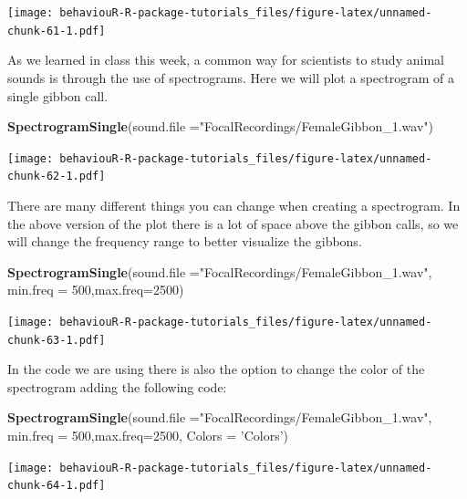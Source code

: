 \documentclass[]{book}
\newenvironment{Shaded}{\begin{snugshade}}{\end{snugshade}}
\newcommand{\DataTypeTok}[1]{\textcolor[rgb]{0.13,0.29,0.53}{#1}}
\newcommand{\DecValTok}[1]{\textcolor[rgb]{0.00,0.00,0.81}{#1}}
\newcommand{\KeywordTok}[1]{\textcolor[rgb]{0.13,0.29,0.53}{\textbf{#1}}}
\newcommand{\NormalTok}[1]{#1}
\newcommand{\StringTok}[1]{\textcolor[rgb]{0.31,0.60,0.02}{#1}}
\begin{document}
\texttt{[image: behaviouR-R-package-tutorials\_files/figure-latex/unnamed-chunk-61-1.pdf]}

As we learned in class this week, a common way for scientists to study animal sounds is through the use of spectrograms. Here we will plot a spectrogram of a single gibbon call.

\begin{Shaded}
\begin{Highlighting}[]
\KeywordTok{SpectrogramSingle}\NormalTok{(}\DataTypeTok{sound.file =}\StringTok{"FocalRecordings/FemaleGibbon_1.wav"}\NormalTok{)}
\end{Highlighting}
\end{Shaded}

\texttt{[image: behaviouR-R-package-tutorials\_files/figure-latex/unnamed-chunk-62-1.pdf]}

There are many different things you can change when creating a spectrogram. In the above version of the plot there is a lot of space above the gibbon calls, so we will change the frequency range to better visualize the gibbons.

\begin{Shaded}
\begin{Highlighting}[]
\KeywordTok{SpectrogramSingle}\NormalTok{(}\DataTypeTok{sound.file =}\StringTok{"FocalRecordings/FemaleGibbon_1.wav"}\NormalTok{,}
                  \DataTypeTok{min.freq =} \DecValTok{500}\NormalTok{,}\DataTypeTok{max.freq=}\DecValTok{2500}\NormalTok{)}
\end{Highlighting}
\end{Shaded}

\texttt{[image: behaviouR-R-package-tutorials\_files/figure-latex/unnamed-chunk-63-1.pdf]}

In the code we are using there is also the option to change the color of the spectrogram adding the following code:

\begin{Shaded}
\begin{Highlighting}[]
\KeywordTok{SpectrogramSingle}\NormalTok{(}\DataTypeTok{sound.file =}\StringTok{"FocalRecordings/FemaleGibbon_1.wav"}\NormalTok{,}
                  \DataTypeTok{min.freq =} \DecValTok{500}\NormalTok{,}\DataTypeTok{max.freq=}\DecValTok{2500}\NormalTok{,}
                  \DataTypeTok{Colors =} \StringTok{'Colors'}\NormalTok{)}
\end{Highlighting}
\end{Shaded}

\texttt{[image: behaviouR-R-package-tutorials\_files/figure-latex/unnamed-chunk-64-1.pdf]}
\end{document}

